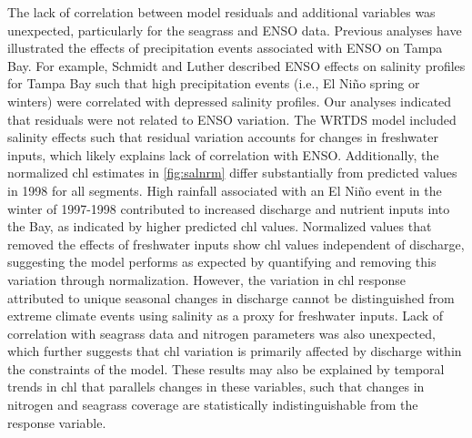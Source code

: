 \documentclass{svjour3}\usepackage[]{graphicx}\usepackage[]{color}
\begin{document}
The lack of correlation between model residuals and additional variables was unexpected, particularly for the seagrass and \ac{ENSO} data.  Previous analyses have illustrated the effects of precipitation events associated with \ac{ENSO} on Tampa Bay.  For example, Schmidt and Luther \cite{Schmidt02} described \ac{ENSO} effects on salinity profiles for Tampa Bay such that high precipitation events (i.e., El Ni\~{n}o spring or winters) were correlated with depressed salinity profiles.  Our analyses indicated that residuals were not related to \ac{ENSO} variation.  The \ac{WRTDS} model included salinity effects such that residual variation accounts for changes in freshwater inputs, which likely explains lack of correlation with \ac{ENSO}. Additionally, the normalized \ac{chl} estimates in \cref{fig:salnrm} differ substantially from predicted values in 1998 for all segments.  High rainfall associated with an El Ni\~{n}o event in the winter of 1997-1998 contributed to increased discharge and nutrient inputs into the Bay, as indicated by higher predicted \ac{chl} values.  Normalized values that removed the effects of freshwater inputs show \ac{chl} values independent of discharge, suggesting the model performs as expected by quantifying and removing this variation through normalization.  However, the variation in \ac{chl} response attributed to unique seasonal changes in discharge cannot be distinguished from extreme climate events using salinity as a proxy for freshwater inputs.  Lack of correlation with seagrass data and nitrogen parameters was also unexpected, which further suggests that \ac{chl} variation is primarily affected by discharge within the constraints of the model.  These results may also be explained by temporal trends in \ac{chl} that parallels changes in these variables, such that changes in nitrogen and seagrass coverage are statistically indistinguishable from the response variable.  
\end{document}
